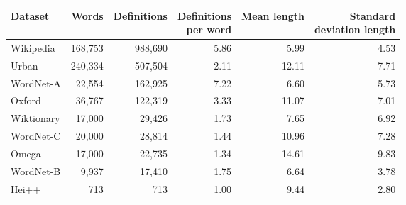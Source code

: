 \small
\begin{tabular}{|l|rr|rrr|}
    \hline
    Dataset    & Words   & Definitions & \makecell[r]{Definitions                \\ per word}  & Mean length & \makecell[r]{Standard \\ deviation length} \\
    \hline
    Wikipedia  & 168,753 & 988,690     & 5.86                     & 5.99  & 4.53 \\
    Urban      & 240,334 & 507,504     & 2.11                     & 12.11 & 7.71 \\
    WordNet-A  & 22,554  & 162,925     & 7.22                     & 6.60  & 5.73 \\
    Oxford     & 36,767  & 122,319     & 3.33                     & 11.07 & 7.01 \\
    Wiktionary & 17,000  & 29,426      & 1.73                     & 7.65  & 6.92 \\
    WordNet-C  & 20,000  & 28,814      & 1.44                     & 10.96 & 7.28 \\
    Omega      & 17,000  & 22,735      & 1.34                     & 14.61 & 9.83 \\
    WordNet-B  & 9,937   & 17,410      & 1.75                     & 6.64  & 3.78 \\
    Hei++      & 713     & 713         & 1.00                     & 9.44  & 2.80 \\
    \hline
\end{tabular}
